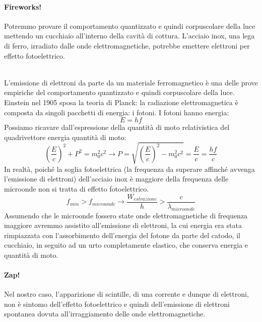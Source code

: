 \documentclass{article}
\begin{document}
\paragraph{Fireworks!} Potremmo provare il comportamento quantizzato e quindi corpuscolare della luce mettendo un cucchiaio all'interno della cavità di cottura.
L'acciaio inox, una lega di ferro, irradiato dalle onde elettromagnetiche, potrebbe emettere elettroni per effetto fotoelettrico. 
\begin{figure}[h]
\centering
{}
\end{figure}\\
L'emissione di elettroni da parte da un materiale ferromagnetico è una delle prove empiriche del comportamento quantizzato e quindi corpuscolare della luce.
Einstein nel 1905 sposa la teoria di Planck: la radiazione elettromagnetica è composta da singoli pacchetti di energia: i fotoni.
I fotoni hanno energia: 
\[ E = hf\]
Possiamo ricavare dall'espressione della quantità di moto relativistica del quadrivettore energia quantità di moto:
\[ \left( \frac{E}{c} \right)^2 + P^2 = m_0^2c^2 \to P = \sqrt{\left( \frac{E}{c} \right)^2 - m_0^2c^2}  = \frac{E}{c} = \frac{hf}{c}\]
In realtà, poiché la soglia fotoelettrica (la frequenza da superare affinché avvenga l'emissione di elettroni) dell'acciaio inox è maggiore della frequenza delle microonde non si tratta di effetto fotoelettrico.
\[ f_{min}> f_{microonde} \to \frac{W_{estrazione}}{h} >\frac{c}{\lambda_{microonde}}\]
 Assumendo che le microonde fossero state onde elettromagnetiche di frequenza maggiore avremmo assistito all'emissione di elettroni, la cui energia era stata rimpiazzata con l'assorbimento dell'energia del fotone da parte del catodo, il cucchiaio,  in seguito ad  un urto completamente elastico, che conserva energia e quantità di moto.
\paragraph{Zap!} Nel nostro caso, l'apparizione di scintille, di una corrente e dunque di elettroni, non è sintomo dell'effetto fotoelettrico e quindi dell'emissione di elettroni spontanea dovuta all'irraggiamento delle onde elettromagnetiche.
\\
\end{document}
